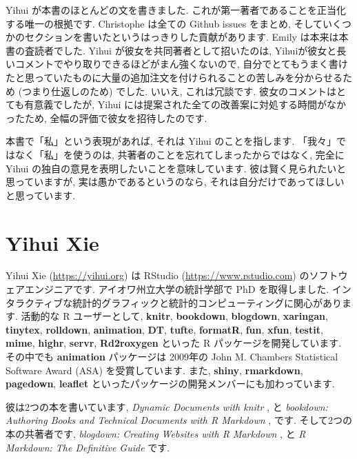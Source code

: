\documentclass[
  11pt,
  lualatex,ja=standard,jafont=noto]{bxjsreport}
\begin{document}
Yihui が本書のほとんどの文を書きました. これが第一著者であることを正当化する唯一の根拠です. Christophe は全ての Github issues をまとめ, そしていくつかのセクションを書いたというはっきりした貢献があります. Emily は本来は本書の査読者でした. Yihui が彼女を共同著者として招いたのは, Yihuiが彼女と長いコメントでやり取りできるほどがまん強くないので, 自分でとてもうまく書けたと思っていたものに大量の追加注文を付けられることの苦しみを分からせるため (つまり仕返しのため) でした. いいえ, これは冗談です. 彼女のコメントはとても有意義でしたが, Yihui には提案された全ての改善案に対処する時間がなかったため, 全幅の評価で彼女を招待したのです.

本書で「私」という表現があれば, それは Yihui のことを指します. 「我々」ではなく「私」を使うのは, 共著者のことを忘れてしまったからではなく, 完全に Yihui の独自の意見を表明したいことを意味しています. 彼は賢く見られたいと思っていますが, 実は愚かであるというのなら, それは自分だけであってほしいと思っています.

\hypertarget{yihui-xie}{%
\section*{Yihui Xie}\label{yihui-xie}}

Yihui Xie (\url{https://yihui.org}) は RStudio (\url{https://www.rstudio.com}) のソフトウェアエンジニアです. アイオワ州立大学の統計学部で PhD を取得しました. インタラクティブな統計的グラフィックと統計的コンピューティングに関心があります. 活動的な R ユーザーとして, \textbf{knitr}, \textbf{bookdown}, \textbf{blogdown}, \textbf{xaringan}, \textbf{tinytex}, \textbf{rolldown}, \textbf{animation}, \textbf{DT}, \textbf{tufte}, \textbf{formatR}, \textbf{fun}, \textbf{xfun}, \textbf{testit}, \textbf{mime}, \textbf{highr}, \textbf{servr}, \textbf{Rd2roxygen} といった R パッケージを開発しています. その中でも \textbf{animation} パッケージは 2009年の John M. Chambers Statistical Software Award (ASA) を受賞しています. また, \textbf{shiny}, \textbf{rmarkdown}, \textbf{pagedown}, \textbf{leaflet} といったパッケージの開発メンバーにも加わっています.

彼は2つの本を書いています, \emph{Dynamic Documents with knitr} \autocite{knitr2015}, と \emph{bookdown: Authoring Books and Technical Documents with R Markdown} \autocite{bookdown2016}, です. そして2つの本の共著者です, \emph{blogdown: Creating Websites with R Markdown} \autocite{blogdown2017}, と \emph{R Markdown: The Definitive Guide} \autocite{rmarkdown2018} です.
\end{document}
